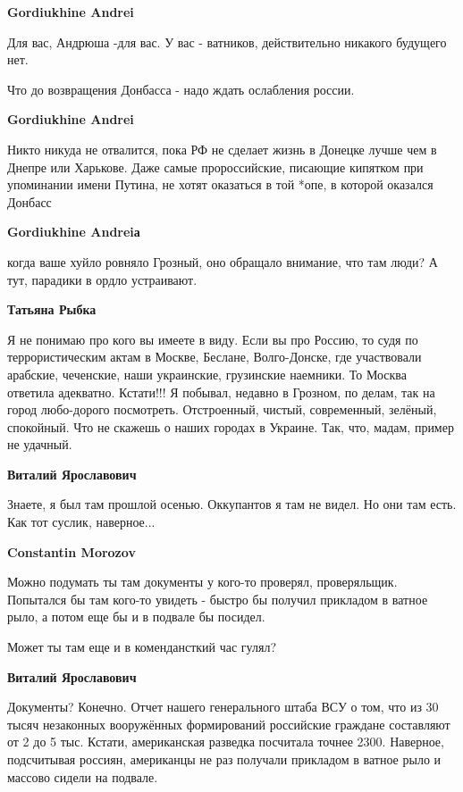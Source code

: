 \begin{itemize}
\begin{itemize}
\textbf{Gordiukhine Andrei} 

Для вас, Андрюша -для вас. У вас - ватников, действительно никакого будущего
нет.

Что до возвращения Донбасса - надо ждать ослабления россии.

\textbf{Gordiukhine Andrei} 

Никто никуда не отвалится, пока РФ не сделает жизнь в Донецке лучше чем в
Днепре или Харькове. Даже самые пророссийские, писающие кипятком при упоминании
имени Путина, не хотят оказаться в той *опе, в которой оказался Донбасс

\textbf{Gordiukhine Andreiа} 

когда ваше хуйло ровняло Грозный, оно обращало внимание, что там люди? А тут,
парадики в ордло устраивают.

\textbf{Татьяна Рыбка} 

Я не понимаю про кого вы имеете в виду. Если вы про Россию, то судя по
террористическим актам в Москве, Беслане, Волго-Донске, где участвовали
арабские, чеченские, наши украинские, грузинские наемники. То Москва ответила
адекватно. Кстати!!! Я побывал, недавно в Грозном, по делам, так на город
любо-дорого посмотреть. Отстроенный, чистый, современный, зелёный, спокойный.
Что не скажешь о наших городах в Украине. Так, что, мадам, пример не удачный.

\textbf{Виталий Ярославович} 

Знаете, я был там прошлой осенью. Оккупантов я там не видел. Но они там есть.
Как тот суслик, наверное...


\textbf{Constantin Morozov} 

Можно подумать ты там документы у кого-то проверял, проверяльщик. Попытался бы
там кого-то увидеть - быстро бы получил прикладом в ватное рыло, а потом еще бы
и в подвале бы посидел.

Может ты там еще и в комендансткий час гулял?

\textbf{Виталий Ярославович} 

Документы? Конечно. Отчет нашего генерального штаба ВСУ о том, что из 30 тысяч
незаконных вооружённых формирований российские граждане составляют от 2 до 5
тыс. Кстати, американская разведка посчитала точнее 2300. Наверное, подсчитывая
россиян, американцы не раз получали прикладом в ватное рыло и массово сидели на
подвале.


\end{itemize}
\end{itemize}
